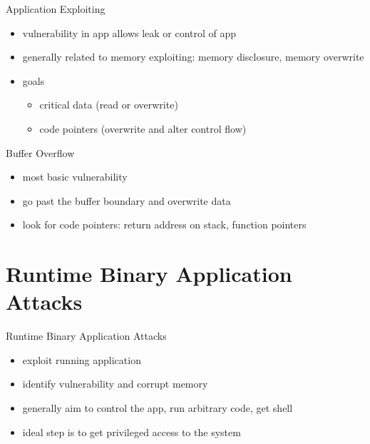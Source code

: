 \documentclass{curs}
\begin{document}
\begin{frame}{Application Exploiting}
  \begin{itemize}
    \pause \item vulnerability in app allows leak or control of app
    \pause \item generally related to memory exploiting: memory disclosure, memory overwrite
    \pause \item goals
      \begin{itemize}
        \pause \item critical data (read or overwrite)
        \pause \item code pointers (overwrite and alter control flow)
      \end{itemize}
  \end{itemize}
\end{frame}

\begin{frame}{Buffer Overflow}
  \begin{itemize}
    \pause \item most basic vulnerability
    \pause \item go past the buffer boundary and overwrite data
    \pause \item look for code pointers: return address on stack, function pointers
  \end{itemize}
\end{frame}

\section{Runtime Binary Application Attacks}

\begin{frame}{Runtime Binary Application Attacks}
  \begin{itemize}
    \pause \item exploit running application
    \pause \item identify vulnerability and corrupt memory
    \pause \item generally aim to control the app, run arbitrary code, get shell
    \pause \item ideal step is to get privileged access to the system
  \end{itemize}
\end{frame}
\end{document}
